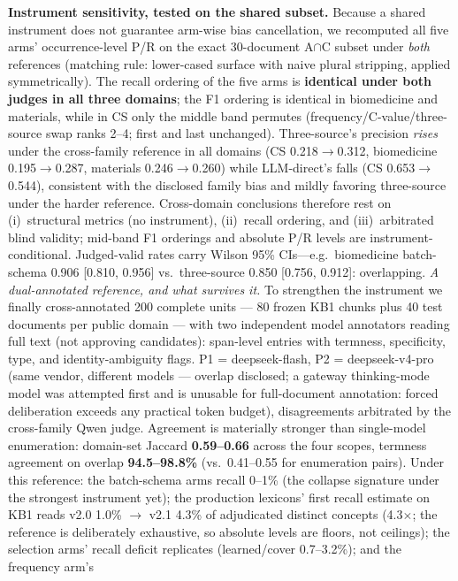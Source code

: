 \documentclass[preprint,12pt]{elsarticle}
\begin{document}
\textbf{Instrument sensitivity, tested on the shared subset.} Because a
shared instrument does not guarantee arm-wise bias cancellation, we
recomputed all five arms' occurrence-level P/R on the exact
30-document A$\cap$C subset under \emph{both} references (matching
rule: lower-cased surface with naive plural stripping, applied
symmetrically). The recall ordering of the five arms is
\textbf{identical under both judges in all three domains}; the F1
ordering is identical in biomedicine and materials, while in CS only
the middle band permutes (frequency/C-value/three-source swap ranks
2--4; first and last unchanged). Three-source's precision
\emph{rises} under the cross-family reference in all domains (CS
0.218$\to$0.312, biomedicine 0.195$\to$0.287, materials
0.246$\to$0.260) while LLM-direct's falls (CS 0.653$\to$0.544),
consistent with the disclosed family bias and mildly favoring
three-source under the harder reference. Cross-domain conclusions
therefore rest on (i)~structural metrics (no instrument),
(ii)~recall ordering, and (iii)~arbitrated blind validity; mid-band F1
orderings and absolute P/R levels are instrument-conditional.
Judged-valid rates carry Wilson 95\% CIs---e.g.\ biomedicine
batch-schema 0.906 [0.810, 0.956] vs.\ three-source 0.850 [0.756,
0.912]: overlapping.
\emph{A dual-annotated reference, and what survives it.} To strengthen
the instrument we finally cross-annotated 200 complete units --- 80
frozen KB1 chunks plus 40 test documents per public domain --- with
two independent model annotators reading full text (not approving
candidates): span-level entries with termness, specificity, type, and
identity-ambiguity flags. P1 = deepseek-flash, P2 = deepseek-v4-pro
(same vendor, different models --- overlap disclosed; a gateway
thinking-mode model was attempted first and is unusable for
full-document annotation: forced deliberation exceeds any practical
token budget), disagreements arbitrated by the cross-family Qwen
judge. Agreement is materially stronger than single-model enumeration:
domain-set Jaccard \textbf{0.59--0.66} across the four scopes,
termness agreement on overlap \textbf{94.5--98.8\%} (vs.\ 0.41--0.55
for enumeration pairs). Under this reference: the batch-schema arms
recall 0--1\% (the collapse signature under the strongest instrument
yet); the production lexicons' first recall estimate on KB1 reads
v2.0 1.0\% $\to$ v2.1 4.3\% of adjudicated distinct concepts
(4.3$\times$; the reference is deliberately exhaustive, so absolute
levels are floors, not ceilings); the selection arms' recall deficit
replicates (learned/cover 0.7--3.2\%); and the frequency arm's
\end{document}

